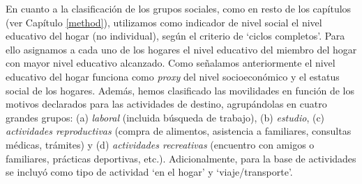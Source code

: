 \documentclass[
  spanish,
  a4paper,%
  chapterprefix=true,%
  DIV=calc,%
  twoside]{scrbook}%
\begin{document}
En cuanto a la clasificación de los grupos sociales, como en resto de
los capítulos (ver Capítulo \ref{method}),
utilizamos como indicador de nivel social el
nivel educativo del hogar (no individual), según el criterio de `ciclos
completos'. Para ello asignamos a cada uno de los hogares el nivel
educativo del miembro del hogar con mayor nivel educativo alcanzado.
Como señalamos anteriormente el nivel educativo del hogar funciona como
\emph{proxy} del nivel socioeconómico y el estatus social de los hogares.
Además, hemos clasificado las movilidades en función de
los motivos declarados para las actividades de destino, agrupándolas en
cuatro grandes grupos: (a) \emph{laboral} (incluida búsqueda de trabajo), (b)
\emph{estudio}, (c) \emph{actividades reproductivas} (compra de alimentos,
asistencia a familiares, consultas médicas, trámites) y (d) \emph{actividades
recreativas} (encuentro con amigos o familiares, prácticas deportivas,
etc.). Adicionalmente, para la base de actividades se incluyó como tipo
de actividad `en el hogar' y `viaje/transporte'.
\end{document}
